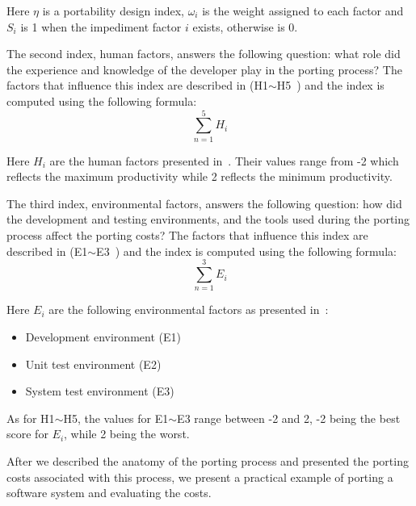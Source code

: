 Here $\eta$ is a portability design index, $\omega_i$ is the weight assigned to
each factor and $S_i$ is 1 when the impediment factor $i$ exists, otherwise is
0.~

The second index, human factors, answers the following question: what role did
the experience and knowledge of the developer play in the porting process? The
factors that influence this index are described in (H1$\sim$H5~\cite{hakuta}) and
the index is computed using the following formula: \[ \sum_{n=1}^{5} H_i \]

Here $H_i$ are the human factors presented in~\cite{hakuta}. Their values range
from -2 which reflects the maximum productivity while 2 reflects the minimum
productivity.

The third index, environmental factors, answers the following question: how did
the development and testing environments, and the tools used during the porting
process affect the porting costs? The factors that influence this index are
described in (E1$\sim$E3~\cite{hakuta}) and the index is computed using the
following formula: \[ \sum_{n=1}^{3} E_i \]

Here $E_i$ are the following environmental factors as presented in~\cite{hakuta}:
\begin{itemize}
    \item Development environment (E1)
    \item Unit test environment (E2)
    \item System test environment (E3)
\end{itemize}

As for H1$\sim$H5, the values for E1$\sim$E3 range between -2 and 2, -2 being the best
score for $E_i$, while 2 being the worst.

After we described the anatomy of the porting process and presented the porting
costs associated with this process, we present a practical example of porting a
software system and evaluating the costs.
